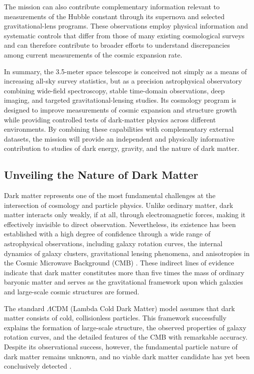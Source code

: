 The mission can also contribute complementary information relevant to measurements of the Hubble constant through its supernova and selected gravitational-lens programs. These observations employ physical information and systematic controls that differ from those of many existing cosmological surveys and can therefore contribute to broader efforts to understand discrepancies among current measurements of the cosmic expansion rate.

In summary, the 3.5-meter space telescope is conceived not simply as a means of increasing all-sky survey statistics, but as a precision astrophysical observatory combining wide-field spectroscopy, stable time-domain observations, deep imaging, and targeted gravitational-lensing studies. Its cosmology program is designed to improve measurements of cosmic expansion and structure growth while providing controlled tests of dark-matter physics across different environments. By combining these capabilities with complementary external datasets, the mission will provide an independent and physically informative contribution to studies of dark energy, gravity, and the nature of dark matter.

\subsection{Unveiling the Nature of Dark Matter}\label{unveiling-the-nature-of-dark-matter}

Dark matter represents one of the most fundamental challenges at the intersection of cosmology and particle physics. Unlike ordinary matter, dark matter interacts only weakly, if at all, through electromagnetic forces, making it effectively invisible to direct observation. Nevertheless, its existence has been established with a high degree of confidence through a wide range of astrophysical observations, including galaxy rotation curves, the internal dynamics of galaxy clusters, gravitational lensing phenomena, and anisotropies in the Cosmic Microwave Background (CMB) \cite{roos2010}. These indirect lines of evidence indicate that dark matter constitutes more than five times the mass of ordinary baryonic matter and serves as the gravitational framework upon which galaxies and large-scale cosmic structures are formed.

The standard $\Lambda$CDM (Lambda Cold Dark Matter) model assumes that dark matter consists of cold, collisionless particles. This framework successfully explains the formation of large-scale structure, the observed properties of galaxy rotation curves, and the detailed features of the CMB with remarkable accuracy. Despite its observational success, however, the fundamental particle nature of dark matter remains unknown, and no viable dark matter candidate has yet been conclusively detected \cite{arbey2021}.

